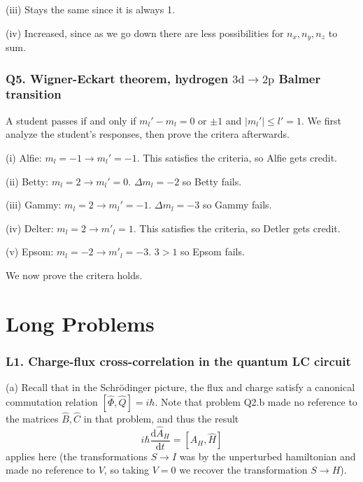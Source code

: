 \documentclass[11pt, letterpaper]{article}
\begin{document}
(iii) Stays the same since it is always 1.

(iv) Increased, since as we go down there are less possibilities for $n_x,n_y,n_z$ to sum.

\section{Q5. Wigner-Eckart theorem, hydrogen $3\mathrm{d} \to 2\mathrm{p} $ Balmer transition}

A student passes if and only if $m_l'-m_l=0$ or $\pm 1$ and $\left| m_l' \right| \leq l'=1$. We first analyze the student's responses, then prove the critera afterwards.

(i) Alfie: $m_l=-1\to m_l'=-1$. This satisfies the criteria, so Alfie gets credit.

(ii) Betty: $m_l=2\to m_l'=0$. $\Delta m_l=-2$ so Betty fails.

(iii) Gammy: $m_l=2\to m_l'=-1$. $\Delta m_l=-3$ so Gammy fails.

(iv) Delter: $m_l=2\to m'_l=1$. This satisfies the criteria, so Detler gets credit.

(v) Epsom: $m_l=-2\to m'_l=-3$. $3>1$ so Epsom fails.

We now prove the critera holds.

\part{Long Problems}
\section{L1. Charge-flux cross-correlation in the quantum LC circuit}
(a) Recall that in the Schr\"odinger picture, the flux and charge satisfy a canonical commutation relation $[ \hat{\Phi }, \hat{Q}  ] =i\hbar $. Note that problem Q2.b made no reference to the matrices $\hat{B} ,\hat{C}$ in that problem, and thus the result
\[
	i\hbar \frac{\mathrm{d}\hat{A} _H}{\mathrm{d}t} = \left[ \hat{A} _H, \hat{H}  \right] 
\]
applies here (the transformations $S\to I$ was by the unperturbed hamiltonian and made no reference to $V$, so taking $V=0$ we recover the transformation $S\to H$).
\end{document}
